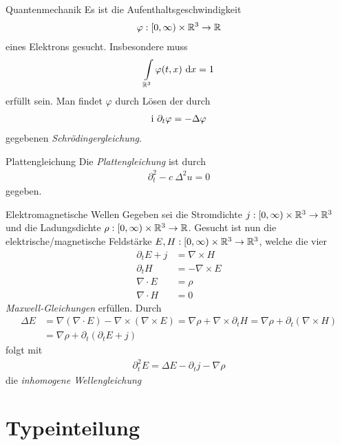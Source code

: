 \begin{genericdf}{Quantenmechanik}
Es ist die Aufenthaltsgeschwindigkeit
\begin{align*}
\varphi : [0, \infty) \times \mathbb{R}^3 \to \mathbb{R}
\end{align*}
eines Elektrons gesucht.
Insbesondere muss
\begin{align*}
\int \limits_{\mathbb{R}^3} \varphi(t,x) \ \text{\rmfamily d} x= 1
\end{align*}
erfüllt sein.
Man findet $\varphi$ durch Lösen der durch
\begin{align*}
\textrm{i} \  \partial_t \varphi  = - \Delta \varphi
\end{align*}
gegebenen \textit{Schrödingergleichung}.
\end{genericdf}

\begin{genericdf}{Plattengleichung}
Die \textit{Plattengleichung} ist durch
\begin{align*}
\partial_t^2 - c \ \Delta^2 u = 0
\end{align*}
gegeben.
\end{genericdf}

\begin{genericdf}{Elektromagnetische Wellen}
Gegeben sei die Stromdichte 
$j : [0, \infty) \times \mathbb{R}^3 \to \mathbb{R}^3$
und die Ladungsdichte
$\rho : [0,\infty) \times \mathbb{R}^3 \to \mathbb{R}$.
Gesucht ist nun die elektrische/magnetische Feldstärke $E,H : [0, \infty)\times \mathbb{R}^3 \to \mathbb{R}^3$, 
welche die vier
\begin{align*}
\partial_t E + j &= \nabla \times H\\
\partial_t H 	&= - \nabla \times E\\
\nabla \cdot E &= \rho\\
\nabla \cdot H &= 0
\end{align*}
\textit{Maxwell-Gleichungen} erfüllen.
Durch 
\begin{align*}
\Delta E &= \nabla( \nabla \cdot E ) - \nabla \times ( \nabla \times E) 
= \nabla \rho + \nabla \times \partial_t H 
= \nabla \rho + \partial_t(\nabla \times  H)\\
&= \nabla \rho + \partial_t(\partial_t E + j) 
\end{align*}
folgt mit
\begin{align*}
\partial^2_t E = \Delta E - \partial_t j - \nabla \rho
\end{align*}
die \textit{inhomogene Wellengleichung}
\end{genericdf}

\newpage
\section{Typeinteilung}

